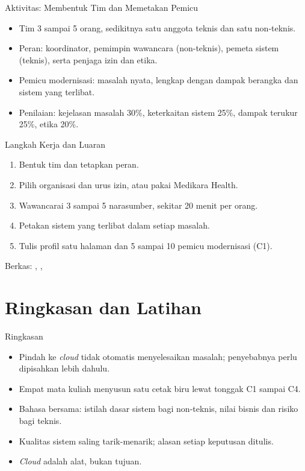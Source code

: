 \documentclass[aspectratio=169, table, 12pt]{beamer}
\begin{document}
\begin{frame}{Aktivitas: Membentuk Tim dan Memetakan Pemicu}
  \begin{itemize}
    \item Tim 3 sampai 5 orang, sedikitnya satu anggota teknis dan satu non-teknis.
    \item Peran: koordinator, pemimpin wawancara (non-teknis), pemeta sistem
          (teknis), serta penjaga izin dan etika.
    \item Pemicu modernisasi: masalah nyata, lengkap dengan dampak berangka dan
          sistem yang terlibat.
    \item Penilaian: kejelasan masalah 30\%, keterkaitan sistem 25\%, dampak terukur
          25\%, etika 20\%.
  \end{itemize}
\end{frame}

\begin{frame}{Langkah Kerja dan Luaran}
  \small
  \begin{enumerate}
    \item Bentuk tim dan tetapkan peran.
    \item Pilih organisasi dan urus izin, atau pakai Medikara Health.
    \item Wawancarai 3 sampai 5 narasumber, sekitar 20 menit per orang.
    \item Petakan sistem yang terlibat dalam setiap masalah.
    \item Tulis profil satu halaman dan 5 sampai 10 pemicu modernisasi (C1).
  \end{enumerate}
  \vspace{4pt}
  {\footnotesize Berkas: ,
  ,
  }
\end{frame}

\section{Ringkasan dan Latihan}

\begin{frame}{Ringkasan}
  \begin{itemize}
    \item Pindah ke \textit{cloud} tidak otomatis menyelesaikan masalah; penyebabnya
          perlu dipisahkan lebih dahulu.
    \item Empat mata kuliah menyusun satu cetak biru lewat tonggak C1 sampai C4.
    \item Bahasa bersama: istilah dasar sistem bagi non-teknis, nilai bisnis dan
          risiko bagi teknis.
    \item Kualitas sistem saling tarik-menarik; alasan setiap keputusan ditulis.
    \item \textit{Cloud} adalah alat, bukan tujuan.
  \end{itemize}
\end{frame}
\end{document}
